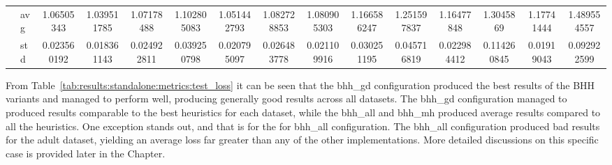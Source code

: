\begin{table}[H]
{\begin{tabular}{rlccc|c|c|c|c|c|ccccc}
			                                                                               & avg                & \cellcolor[rgb]{ .631,  .816,  .494}1.06505343                                 & \cellcolor[rgb]{ .388,  .745,  .482}\textcolor[rgb]{ 0,  .38,  0}{1.039511785} & \cellcolor[rgb]{ .698,  .831,  .498}1.07178488                                 & \cellcolor[rgb]{ 1,  .922,  .518}1.102805083    & \cellcolor[rgb]{ .502,  .776,  .486}1.051442793                                & \cellcolor[rgb]{ .804,  .863,  .506}1.082728853 & \cellcolor[rgb]{ .788,  .859,  .502}1.080905303                                & \cellcolor[rgb]{ .996,  .839,  .502}1.166586247 & \cellcolor[rgb]{ .992,  .725,  .482}1.251597837 & \cellcolor[rgb]{ .996,  .843,  .502}1.16477848  & \cellcolor[rgb]{ .988,  .659,  .467}1.3045869   & \cellcolor[rgb]{ .996,  .824,  .502}1.17741444  & \cellcolor[rgb]{ .973,  .412,  .42}1.489554557  \\
			                                                                               & std                & 0.023560192                                                                    & 0.018361143                                                                    & 0.024922811                                                                    & 0.039250798                                     & 0.020795097                                                                    & 0.026483778                                     & 0.021109916                                                                    & 0.030251195                                     & 0.045716819                                     & 0.022984412                                     & 0.114260845                                     & 0.01919043                                      & 0.092922599                                     \\
			\bottomrule
		\end{tabular}%
	}
\end{table}%

From Table~\ref{tab:results:standalone:metrics:test_loss} it can be seen that the bhh\_gd configuration produced the best results of the \acs{BHH} variants and managed to perform well, producing generally good results across all datasets. The bhh\_gd configuration managed to produced results comparable to the best heuristics for each dataset, while the bhh\_all and bhh\_mh produced average results compared to all the heuristics. One exception stands out, and that is for the for bhh\_all configuration. The bhh\_all configuration produced bad results for the adult dataset, yielding an average loss far greater than any of the other implementations. More detailed discussions on this specific case is provided later in the Chapter.

